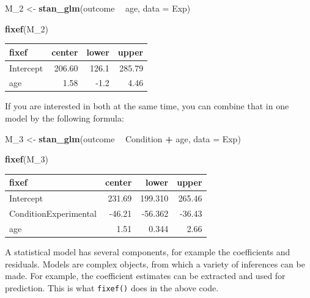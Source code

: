 \documentclass[]{svmono}
\newenvironment{Shaded}{\begin{snugshade}}{\end{snugshade}}
\newcommand{\KeywordTok}[1]{\textcolor[rgb]{0.13,0.29,0.53}{\textbf{#1}}}
\newcommand{\DataTypeTok}[1]{\textcolor[rgb]{0.13,0.29,0.53}{#1}}
\newcommand{\DecValTok}[1]{\textcolor[rgb]{0.00,0.00,0.81}{#1}}
\newcommand{\StringTok}[1]{\textcolor[rgb]{0.31,0.60,0.02}{#1}}
\newcommand{\OperatorTok}[1]{\textcolor[rgb]{0.81,0.36,0.00}{\textbf{#1}}}
\newcommand{\NormalTok}[1]{#1}
\begin{document}
\begin{Shaded}
\begin{Highlighting}[]
\NormalTok{M_}\DecValTok{2}\NormalTok{ <-}\StringTok{ }
\StringTok{  }\KeywordTok{stan_glm}\NormalTok{(outcome }\OperatorTok{~}\StringTok{ }\NormalTok{age, }
     \DataTypeTok{data =}\NormalTok{ Exp)}
\end{Highlighting}
\end{Shaded}

\begin{Shaded}
\begin{Highlighting}[]
\KeywordTok{fixef}\NormalTok{(M_}\DecValTok{2}\NormalTok{)}
\end{Highlighting}
\end{Shaded}

\begin{longtable}[]{@{}lrrr@{}}
\toprule
fixef & center & lower & upper\tabularnewline
\midrule
\endhead
Intercept & 206.60 & 126.1 & 285.79\tabularnewline
age & 1.58 & -1.2 & 4.46\tabularnewline
\bottomrule
\end{longtable}

If you are interested in both at the same time, you can combine that in
one model by the following formula:

\begin{Shaded}
\begin{Highlighting}[]
\NormalTok{M_}\DecValTok{3}\NormalTok{ <-}\StringTok{ }
\StringTok{  }\KeywordTok{stan_glm}\NormalTok{(outcome }\OperatorTok{~}\StringTok{ }\NormalTok{Condition }\OperatorTok{+}\StringTok{ }\NormalTok{age, }
     \DataTypeTok{data =}\NormalTok{ Exp)}
\end{Highlighting}
\end{Shaded}

\begin{Shaded}
\begin{Highlighting}[]
\KeywordTok{fixef}\NormalTok{(M_}\DecValTok{3}\NormalTok{)}
\end{Highlighting}
\end{Shaded}

\begin{longtable}[]{@{}lrrr@{}}
\toprule
fixef & center & lower & upper\tabularnewline
\midrule
\endhead
Intercept & 231.69 & 199.310 & 265.46\tabularnewline
ConditionExperimental & -46.21 & -56.362 & -36.43\tabularnewline
age & 1.51 & 0.344 & 2.66\tabularnewline
\bottomrule
\end{longtable}

A statistical model has several components, for example the coefficients
and residuals. Models are complex objects, from which a variety of
inferences can be made. For example, the coefficient estimates can be
extracted and used for prediction. This is what \texttt{fixef()} does in
the above code.
\end{document}
